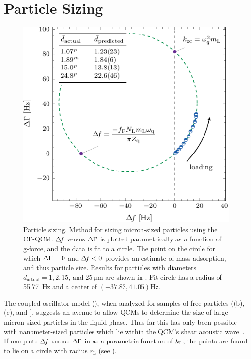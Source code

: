 \section{Particle Sizing}
\begin{figure}[ht]
\centering
\includegraphics{qcm/figures/circlefit.pdf}
\caption{ Particle sizing.  Method for sizing micron-sized particles using the CF-QCM\@.
$\Delta\!f$ versus $\Delta\Gamma$ is plotted parametrically as a function of g-force, and
the data is fit to a circle.  The point on the circle for which $\Delta\Gamma=0$ and
$\Delta\!f<0$ provides an estimate of mass adsorption, and thus particle size.
Results for particles with diameters $\bar{d}_\mathrm{actual}=1, 2,
15,\,\mathrm{and}\;\SI{25}{\micro\meter}$ are shown in
.  Fit circle has a radius of \SI{55.77}{\hertz} and
a center of $(-37.83,41.05) \si{\hertz}$. }
\label{fig:circlefit}
\end{figure}

The coupled oscillator model (), when analyzed for
samples of free particles ((b),
(c), and ), suggests an avenue
to allow QCMs to determine the size of large micron-sized particles in the
liquid phase.  Thus far this has only been possible with nanometer-sized
particles which lie within the QCM's shear acoustic
wave~\cite{olsson2013using}.  If one plots $\Delta\!f$ versus $\Delta\Gamma$ in
 as a parametric function of $k_\mathrm{L}$, the points are
found to lie on a circle with radius $r_\mathrm{L}$ (see
).

